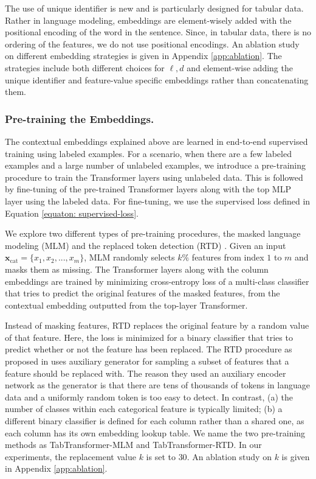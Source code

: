 The use of unique identifier is new and is particularly designed for tabular data. 
Rather in language modeling, embeddings are element-wisely added with the positional encoding of the word in the sentence. Since, in tabular data, there is no ordering of the features, we do not use positional encodings. 
An ablation study on different embedding strategies is given in Appendix \ref{app:ablation}. The strategies include both different choices for $\ell,d$ and element-wise adding the unique identifier and feature-value specific embeddings rather than concatenating them.

\subsubsection{Pre-training the Embeddings.}
The contextual embeddings explained above are learned in end-to-end supervised training using labeled examples. For a scenario, when there are a few labeled examples and a large number of unlabeled examples, 
we introduce a pre-training procedure %
to train the Transformer layers using unlabeled data. This is followed by fine-tuning of the pre-trained Transformer layers along with the top MLP layer using the labeled data. For fine-tuning, we use the supervised loss defined in Equation \eqref{equaton: supervised-loss}. 

We explore two different types of pre-training procedures, the masked language modeling (MLM) \citep{Devlin2019BERTPO} and the replaced token detection (RTD) \citep{clark_electra_2020}. Given an input $\bm{x}_{\text{cat}} = \{x_1, x_2, ..., x_m\}$, MLM randomly selects $k \%$ features from index $1$ to $m$ and masks them as missing. %
The Transformer layers along with the column embeddings are trained by minimizing cross-entropy loss of a multi-class classifier that tries to predict the original features of the masked features, from the contextual embedding outputted from the top-layer Transformer.

Instead of masking features, RTD replaces the original feature by a random value of that feature. Here, the loss is minimized for a binary classifier that tries to predict whether or not the feature has been replaced. 
The RTD procedure as proposed in \cite{clark_electra_2020} uses auxiliary generator for sampling a subset of features that a feature should be replaced with. The reason they used an auxiliary encoder network as the generator is that there are tens of thousands of tokens in language data and a uniformly random token is too easy to detect. In contrast, (a) the number of classes within each categorical feature is typically limited; (b) a different binary classifier is defined for each column rather than a shared one, as each column has its own embedding lookup table.
We name the two pre-training methods as TabTransformer-MLM and TabTransformer-RTD. In our experiments, the replacement value $k$ is set to $30$. An ablation study on $k$ is given in Appendix \ref{app:ablation}.

